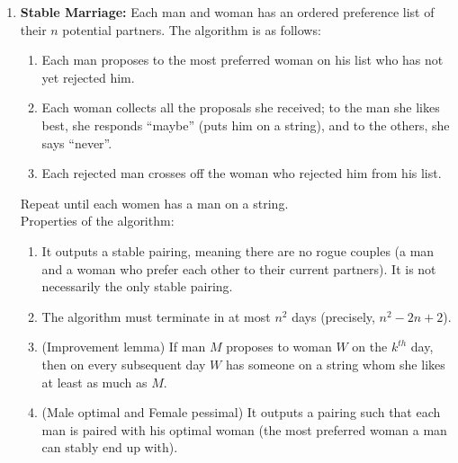 \documentclass[10pt]{article}
\begin{document}
\begin{multicols}{2}
\begin{enumerate}
    \item \textbf{Stable Marriage:} Each man and woman has an ordered preference list of their $n$ potential partners. The algorithm is as follows: 
    \begin{enumerate}
        \item Each man proposes to the most preferred woman on his list who has not yet rejected him.
        \item Each woman collects all the proposals she received; to the man she likes best, she responds “maybe” (puts him on a string), and to the others, she says “never”.
        \item Each rejected man crosses off the woman who rejected him from his list.
    \end{enumerate}
    Repeat until each women has a man on a string. \\
    Properties of the algorithm:
    \begin{enumerate}
        \item It outputs a stable pairing, meaning there are no rogue couples (a man and a woman who prefer each other to their current partners). It is not necessarily the only stable pairing.
        \item The algorithm must terminate in at most $n^2$ days (precisely, $n^2-2n+2$).
        \item (Improvement lemma) If man $M$ proposes to woman $W$ on the $k^{th}$ day, then on every subsequent day $W$ has someone on a string whom she likes at least as much as $M$.
        \item (Male optimal and Female pessimal) It outputs a pairing such that each man is paired with his optimal woman (the most preferred woman a man can stably end up with). 
    \end{enumerate}
    

\end{enumerate}
\end{multicols}
\end{document}
